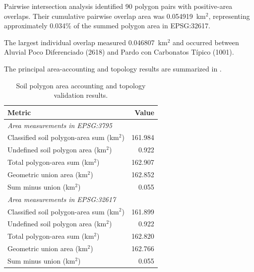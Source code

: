 Pairwise intersection analysis identified
90 polygon pairs with positive-area overlaps.
Their cumulative pairwise overlap area was
0.054919~km$^2$, representing approximately
0.034\% of the summed polygon area in
EPSG:32617.

The largest individual overlap measured
0.046807~km$^2$ and occurred between
Aluvial Poco Diferenciado (2618) and
Pardo con Carbonatos Típico (1001).

The principal area-accounting and topology
results are summarized in
.

\begin{table}[htbp]
	\centering
	\caption{
		Soil polygon area accounting and
		topology validation results.
	}
	\label{tab:soil_topology_validation}
	\small
	
	\begin{tabular}{lr}
		\hline
		\textbf{Metric} & \textbf{Value} \\
		\hline
		
		\multicolumn{2}{l}{
			\textit{Area measurements in EPSG:3795}
		} \\
		\hline
		
		Classified soil polygon-area sum (km$^2$)
		& 161.984 \\
		
		Undefined soil polygon area (km$^2$)
		& 0.922 \\
		
		Total polygon-area sum (km$^2$)
		& 162.907 \\
		
		Geometric union area (km$^2$)
		& 162.852 \\
		
		Sum minus union (km$^2$)
		& 0.055 \\
		
		\hline
		\multicolumn{2}{l}{
			\textit{Area measurements in EPSG:32617}
		} \\
		\hline
		
		Classified soil polygon-area sum (km$^2$)
		& 161.899 \\
		
		Undefined soil polygon area (km$^2$)
		& 0.922 \\
		
		Total polygon-area sum (km$^2$)
		& 162.820 \\
		
		Geometric union area (km$^2$)
		& 162.766 \\
		
		Sum minus union (km$^2$)
		& 0.055 \\
		

\end{tabular}
\end{table}

